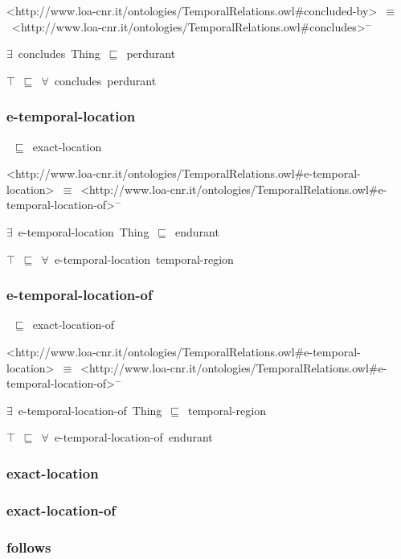 \documentclass{article}
\begin{document}
<http://www.loa-cnr.it/ontologies/TemporalRelations.owl#concluded-by>~\ensuremath{\equiv}~<http://www.loa-cnr.it/ontologies/TemporalRelations.owl#concludes>\ensuremath{^-}

\ensuremath{\exists}~concludes~Thing~\ensuremath{\sqsubseteq}~perdurant

\ensuremath{\top}~\ensuremath{\sqsubseteq}~\ensuremath{\forall}~concludes~perdurant

\subsubsection*{e-temporal-location}

~\ensuremath{\sqsubseteq}~exact-location

<http://www.loa-cnr.it/ontologies/TemporalRelations.owl#e-temporal-location>~\ensuremath{\equiv}~<http://www.loa-cnr.it/ontologies/TemporalRelations.owl#e-temporal-location-of>\ensuremath{^-}

\ensuremath{\exists}~e-temporal-location~Thing~\ensuremath{\sqsubseteq}~endurant

\ensuremath{\top}~\ensuremath{\sqsubseteq}~\ensuremath{\forall}~e-temporal-location~temporal-region

\subsubsection*{e-temporal-location-of}

~\ensuremath{\sqsubseteq}~exact-location-of

<http://www.loa-cnr.it/ontologies/TemporalRelations.owl#e-temporal-location>~\ensuremath{\equiv}~<http://www.loa-cnr.it/ontologies/TemporalRelations.owl#e-temporal-location-of>\ensuremath{^-}

\ensuremath{\exists}~e-temporal-location-of~Thing~\ensuremath{\sqsubseteq}~temporal-region

\ensuremath{\top}~\ensuremath{\sqsubseteq}~\ensuremath{\forall}~e-temporal-location-of~endurant

\subsubsection*{exact-location}

\subsubsection*{exact-location-of}

\subsubsection*{follows}
\end{document}
